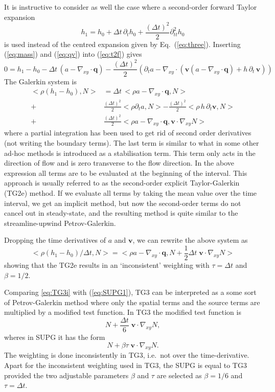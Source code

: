 \documentclass[10pt,a4paper]{book}
\newcommand{\p}{\partial}
\begin{document}
It is instructive to consider as well the case where a second-order forward Taylor expansion
\begin{equation}
h_1=h_0+ \Delta t \, \p_t h_0 + \frac{(\Delta t)^2}{2} \p^2_{tt} h_0 
\label{eq:t2f}
\end{equation}
is used instead of the centred expansion given by  Eq.~(\ref{eq:three}).
Inserting (\ref{eq:mass}) and (\ref{eq:qv}) into (\ref{eq:t2f}) gives
\[
0=h_1- h_0 - \Delta t \, (a -  \nabla_{xy} \cdot \bm{q}) - \frac{(\Delta t)^2}{2} (\p_t a-  \nabla_{xy} \cdot ( \bm{v} (a-\nabla_{xy} \cdot \bm{q}) + h \, \p_t \, \bm{v}))
\]
The Galerkin system is
\begin{align*}
<\rho(h_1-h_0),N> &=\Delta t \, <\rho a -  \nabla_{xy} \cdot \bm{q},N> \nonumber \\
+&\frac{(\Delta t)^2}{2} <\rho \p_t a ,N> - \frac{(\Delta t)^2}{2} <\rho \, h \,\p_t \bm{v}, N> \nonumber \\
+& \frac{(\Delta t)^2}{2} <  \rho a-\nabla_{xy} \cdot \bm{q} , \bm{v} \cdot \nabla_{xy} N>
\end{align*}
where a partial integration has been used to get rid of second order
derivatives (not writing the boundary terms). The last term is similar
to what in some other ad-hoc methods is introduced as a stabilisation
term. This term only acts in the direction of flow and is zero
transverse to the flow direction.  In the above expression all terms
are to be evaluated at the beginning of the interval. This approach is
usually referred to as the second-order explicit Taylor-Galerkin (TG2e)
method. If we evaluate all terms by taking the mean value over the
time interval, we get an implicit method, but now the second-order
terms do not cancel out in steady-state, and the resulting method is
quite similar to the streamline-upwind Petrov-Galerkin.

Dropping the time derivatives of $a$ and $\bm{v}$, we can rewrite the above system as
\[
<\rho(h_1-h_0)/\Delta t,N> =<\rho a -  \nabla_{xy} \cdot \bm{q},N + \frac{1}{2} \Delta t \; \bm{v} \cdot \nabla_{xy} N > 
\]
showing that the TG2e results in an `inconsistent' weighting with $\tau=\Delta t$ and $\beta=1/2$.  



Comparing \ref{eq:TG3i} with (\ref{eq:SUPG1}), TG3 can  be
interpreted as a some sort of Petrov-Galerkin method where only the
spatial terms and the source terms are multiplied by a modified test
function. In  TG3 the modified test function
is
\begin{equation}
N+ \frac{\Delta t}{6}  \; \bm{v} \cdot \nabla_{xy} N,
\label{eq:t3}
\end{equation}
wheres in SUPG it has the form
\begin{equation}
N+ \beta \tau  \; \bm{v} \cdot \nabla_{xy} N .
\label{eq:t4}
\end{equation}
The weighting is done inconsistently in TG3, i.e.\ not over the
time-derivative. Apart for the inconsistent weighting used in TG3,
the SUPG is equal to TG3 provided the two adjustable parameters
$\beta$ and $\tau$ are selected as $\beta=1/6$ and $\tau=\Delta t$.
\end{document}
